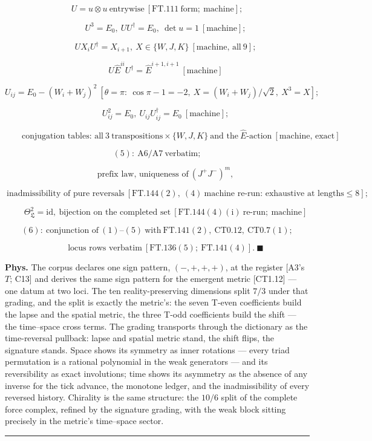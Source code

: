 \begin{theorem}
\[
U=u\otimes u\ \text{entrywise}\ [\mathrm{FT.111}\ \text{form};\ \text{machine}];
\]

\[
\qquad U^3=E_0,\ U U^\dagger=E_0,\ \det u=1\ [\text{machine}];
\]

\[
\qquad U X_i U^\dagger=X_{i+1},\ X\in\{W,J,K\}\ [\text{machine, all}\ 9];
\]

\[
\qquad U\hat E^{ii}U^\dagger=\hat E^{i+1,i+1}\ [\text{machine}]
\]

\[
U_{ij}=E_0-(W_i+W_j)^2\ [\theta=\pi:\ \cos\pi-1=-2,\ X=(W_i{+}W_j)/\sqrt2,\ X^3=X];
\]

\[
\qquad U_{ij}^2=E_0,\ U_{ij}U_{ij}^\dagger=E_0\ [\text{machine}];
\]

\[
\qquad \text{conjugation tables: all}\ 3\ \text{transpositions}\times\{W,J,K\}\ \text{and the}\ \hat E\text{-action}\ [\text{machine, exact}]
\]

\[
(5):\ \mathrm{A6}/\mathrm{A7}\ \text{verbatim};
\]

\[
\qquad \text{prefix law, uniqueness of}\ (J^+J^-)^m,
\]

\[
\ \text{inadmissibility of pure reversals}\ [\mathrm{FT.144}(2),\ (4)\ \text{machine re-run: exhaustive at lengths}\le8];
\]

\[
\qquad \Theta_{\mathfrak L}^2=\mathrm{id},\ \text{bijection on the completed set}\ [\mathrm{FT.144}(4)(\mathrm{i})\ \text{re-run};\ \text{machine}]
\]

\[
(6):\ \text{conjunction of}\ (1)\text{–}(5)\ \text{with}\ \mathrm{FT.141}(2),\ \mathrm{CT0.12},\ \mathrm{CT0.7}(1);
\]

\[
\qquad \text{locus rows verbatim}\ [\mathrm{FT.136}(5);\ \mathrm{FT.141}(4)].\ \blacksquare
\]

\textbf{Phys.} The corpus declares one sign pattern, $(-,+,+,+)$, at the register [A3's $T$; C13] and derives the same sign pattern for the emergent metric [CT1.12] — one datum at two loci. The ten reality-preserving dimensions split $7/3$ under that grading, and the split is exactly the metric's: the seven T-even coefficients build the lapse and the spatial metric, the three T-odd coefficients build the shift — the time–space cross terms. The grading transports through the dictionary as the time-reversal pullback: lapse and spatial metric stand, the shift flips, the signature stands. Space shows its symmetry as inner rotations — every triad permutation is a rational polynomial in the weak generators — and its reversibility as exact involutions; time shows its asymmetry as the absence of any inverse for the tick advance, the monotone ledger, and the inadmissibility of every reversed history. Chirality is the same structure: the $10/6$ split of the complete force complex, refined by the signature grading, with the weak block sitting precisely in the metric's time–space sector.

\vspace{2pt}\noindent\rule{\textwidth}{0.4pt}\vspace{2pt}

\end{theorem}

